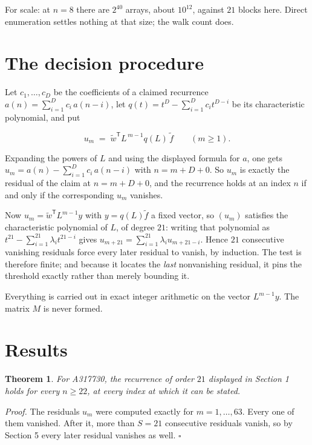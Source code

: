 \documentclass[11pt]{article}
\newtheorem{theorem}{Theorem}
\theoremstyle{definition}
\begin{document}
For scale: at $n = 8$ there are $2^{40}$ arrays, about $10^{12}$, against $21$ blocks here. Direct enumeration settles nothing at that size; the walk count does.

\section{The decision procedure}

Let $c_1,\dots,c_D$ be the coefficients of a claimed recurrence $a(n) = \sum_{i=1}^{D} c_i\,a(n-i)$, let $q(t) = t^{D} - \sum_{i=1}^{D} c_i t^{D-i}$ be its characteristic polynomial, and put

\[u_m \;=\; \tilde w^{\mathsf T} L^{\,m-1} q(L)\,\tilde f \qquad (m \ge 1).\]

Expanding the powers of $L$ and using the displayed formula for $a$, one gets $u_m = a(n) - \sum_{i=1}^{D} c_i\,a(n-i)$ with $n = m + D + 0$. So $u_m$ is exactly the residual of the claim at $n = m + D + 0$, and the recurrence holds at an index $n$ if and only if the corresponding $u_m$ vanishes.

Now $u_m = \tilde w^{\mathsf T} L^{m-1} y$ with $y = q(L)\tilde f$ a fixed vector, so $(u_m)$ satisfies the characteristic polynomial of $L$, of degree $21$: writing that polynomial as $t^{21} - \sum_{i=1}^{21} \lambda_i t^{21-i}$ gives $u_{m+21} = \sum_{i=1}^{21} \lambda_i u_{m+21-i}$. Hence $21$ consecutive vanishing residuals force every later residual to vanish, by induction. The test is therefore finite; and because it locates the {\itshape last} nonvanishing residual, it pins the threshold exactly rather than merely bounding it.

Everything is carried out in exact integer arithmetic on the vector $L^{m-1}y$. The matrix $M$ is never formed.

\section{Results}

\begin{theorem} For A317730, the recurrence of order $21$ displayed in Section 1 holds for every $n \ge 22$, at every index at which it can be stated.\end{theorem}

{\itshape Proof.} The residuals $u_m$ were computed exactly for $m = 1,\dots,63$. Every one of them vanished. After it, more than $S = 21$ consecutive residuals vanish, so by Section 5 every later residual vanishes as well. $\square$
\end{document}
